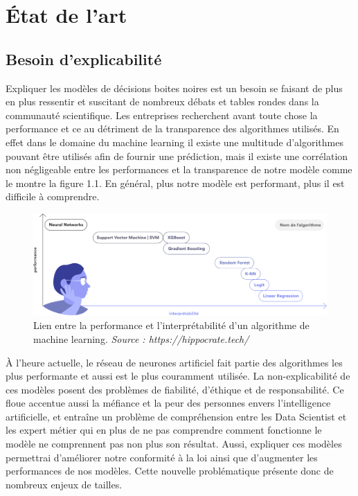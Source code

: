 \chapter{État de l’art}
\section{Besoin d'explicabilité}
Expliquer les modèles de décisions boites noires est un besoin se faisant de plus en plus ressentir et suscitant de nombreux débats et tables rondes dans la communauté scientifique. Les entreprises recherchent avant toute chose la performance et ce au détriment de la transparence des algorithmes utilisés. En effet dans le domaine du machine learning il existe une multitude d'algorithmes pouvant être utilisés afin de fournir une prédiction, mais il existe une corrélation non négligeable entre les performances et la transparence de notre modèle comme le montre la figure 1.1. En général, plus notre modèle est performant, plus il est difficile à comprendre.\par

\begin{figure}[h]
\centering
\includegraphics[scale=0.15]{src_img/performanceAndInterpretabilite.png}
\caption{Lien entre la performance et l'interprétabilité d'un algorithme de machine learning. \textit{Source : https://hippocrate.tech/}}
\label{performanceAndInterpretabilite}
\end{figure}

À l'heure actuelle, le réseau de neurones artificiel fait partie des algorithmes les plus performante et aussi est le plus couramment utilisée.
La non-explicabilité de ces modèles posent des problèmes de fiabilité, d'éthique et de responsabilité. Ce floue accentue aussi la méfiance et la peur des personnes envers l'intelligence artificielle, et entraîne un problème de compréhension entre les Data Scientist et les expert métier qui en plus de ne pas comprendre comment fonctionne le modèle ne comprennent pas non plus son résultat. Aussi, expliquer ces modèles permettrai d'améliorer notre conformité à la loi ainsi que d'augmenter les performances de nos modèles. Cette nouvelle problématique présente donc de nombreux enjeux de tailles.\par

